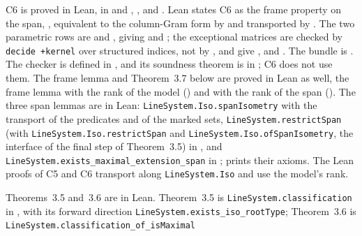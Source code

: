 \begingroup\raggedright
C6 is proved in Lean, in  and ,
,  and .
Lean states C6 as the frame property on the span, , equivalent to the
column-Gram form by  and transported by
. The two parametric rows are 
and , giving  and
; the exceptional matrices are checked by \texttt{decide +kernel} over
structured indices, not by , and give
,  and .
The bundle is . The checker
 is defined in , and its
soundness theorem  is in ;
C6 does not use them. The frame lemma and Theorem~3.7 below are proved in Lean as well, the
frame lemma with the rank of the model () and with the rank of
the span (). The three span lemmas are in Lean:
\texttt{LineSystem.\allowbreak Iso.\allowbreak spanIsometry} with the transport of
the predicates and of the marked sets, \texttt{LineSystem.\allowbreak restrictSpan} (with
\texttt{LineSystem.\allowbreak Iso.\allowbreak restrictSpan} and \texttt{LineSystem.\allowbreak Iso.\allowbreak ofSpanIsometry},
the interface of the final step of Theorem~3.5) in , and
\texttt{LineSystem.\allowbreak exists\_\allowbreak maximal\_\allowbreak extension\_\allowbreak span} in
;  prints their axioms. The Lean
proofs of C5 and C6 transport along \texttt{LineSystem.Iso} and use the model's rank.\par
Theorems~3.5 and~3.6 are in Lean. Theorem~3.5 is
\texttt{LineSystem.\allowbreak classification} in , with its
forward direction \texttt{LineSystem.\allowbreak exists\_\allowbreak iso\_\allowbreak rootType};
Theorem~3.6 is \texttt{LineSystem.\allowbreak classification\_\allowbreak of\_\allowbreak isMaximal}

